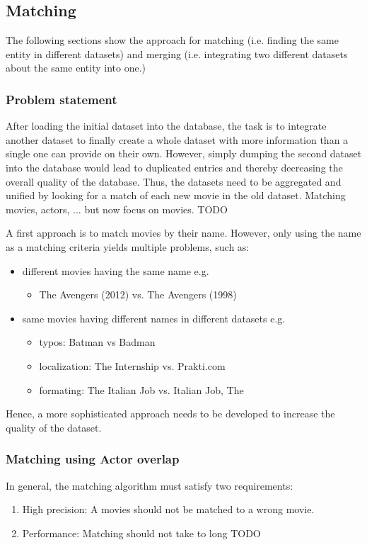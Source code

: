 \subsection{Matching}
\label{subsec_method_matching}

The following sections show the approach for matching (i.e. finding the same entity in different datasets) and merging (i.e. integrating two different datasets about the same entity into one.)

\subsubsection{Problem statement}
After loading the initial dataset into the database, the task is to integrate another dataset to finally create a whole dataset with more information than a single one can provide on their own.
However, simply dumping the second dataset into the database would lead to duplicated entries and thereby decreasing the overall quality of the database.
Thus, the datasets need to be aggregated and unified by looking for a match of each new movie in the old dataset.
Matching movies, actors, ... but now focus on movies. TODO

A first approach is to match movies by their name.
However, only using the name as a matching criteria yields multiple problems, such as:
\begin{itemize}
	\item different movies having the same name e.g.
	\begin{itemize} 
        \item The Avengers (2012) vs. The Avengers (1998)
    \end{itemize}
	\item same movies having different names in different datasets e.g.
	\begin{itemize} 
        \item typos: Batman vs Badman
        \item localization: The Internship vs. Prakti.com
        \item formating: The Italian Job vs. Italian Job, The
     \end{itemize}
\end{itemize}
Hence, a more sophisticated approach needs to be developed to increase the quality of the dataset.

\subsubsection{Matching using Actor overlap}
In general, the matching algorithm must satisfy two requirements:
\begin{enumerate}
	\item{High precision}: A movies should not be matched to a wrong movie.
	\item{Performance:} Matching should not take to long TODO
\end{enumerate}


